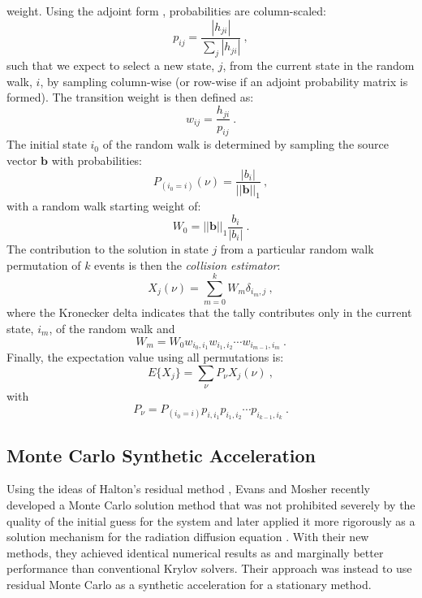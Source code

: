 \documentclass{snamc2013}
\begin{document}
weight. Using the adjoint form \cite{spanier_monte_1969},
probabilities are column-scaled:
\begin{equation}
  p_{ij} = \frac{|h_{ji}|}{\sum_j |h_{ji}|}\:,
  \label{eq:adjoint_probability}
\end{equation}
such that we expect to select a new state, $j$, from the current state
in the random walk, $i$, by sampling column-wise (or row-wise if an
adjoint probability matrix is formed). The transition weight is then
defined as:
\begin{equation}
  w_{ij} = \frac{h_{ji}}{p_{ij}}\:.
  \label{eq:adjoint_weight}
\end{equation}
The initial state $i_0$ of the random walk is determined by sampling
the source vector $\mathbf{b}$ with probabilities:
\begin{equation}
  P_{(i_0=i)}(\nu) = \frac{|b_i|}{||\mathbf{b}||_1}\:,
  \label{eq:adjoint_source_probability}
\end{equation}
with a random walk starting weight of:
\begin{equation}
  W_0 = ||\mathbf{b}||_1 \frac{b_i}{|b_i|}\:.
  \label{eq:adjoint_starting_weight}
\end{equation}
The contribution to the solution in state $j$ from a particular random
walk permutation of $k$ events is then the \textit{collision
  estimator}:
\begin{equation}
  X_{j}(\nu) = \sum_{m=0}^k W_{m} \delta_{i_m,j}\:,
  \label{eq:adjoint_permutation_contribution}
\end{equation}
where the Kronecker delta indicates that the tally contributes only in
the current state, $i_m$, of the random walk and 
\begin{equation}
  W_{m} = W_0 w_{i_0,i_1} w_{i_1,i_2} \cdots w_{i_{m-1},i_m}\:.
  \label{eq:adjoint_permutation_weight}
\end{equation}
Finally, the expectation value using all permutations is:
\begin{equation}
  E\{X_j\} = \sum_{\nu} P_{\nu} X_{j}(\nu)\:,
  \label{eq:adjoint_expectation_value}
\end{equation}
with
\begin{equation}
  P_{\nu} = P_{(i_0=i)} p_{i,i_1} p_{i_1,i_2} \cdots p_{i_{k-1},i_k}\:.
  \label{eq:adjoint_permutation_probability}
\end{equation}

\subsection{Monte Carlo Synthetic Acceleration}
Using the ideas of Halton's residual method
\cite{halton_sequential_1994}, Evans and Mosher recently developed a
Monte Carlo solution method that was not prohibited severely by the
quality of the initial guess for the system \cite{evans_monte_2009}
and later applied it more rigorously as a solution mechanism for the
radiation diffusion equation \cite{evans_monte_2012}. With their new
methods, they achieved identical numerical results as and marginally
better performance than conventional Krylov solvers. Their approach
was instead to use residual Monte Carlo as a synthetic acceleration
for a stationary method. 
\end{document}
